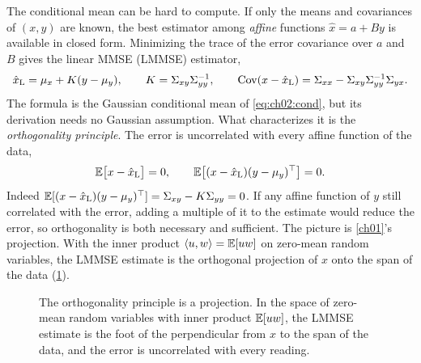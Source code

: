 The conditional mean can be hard to compute. If only the means and
covariances of $(x,y)$ are known, the best estimator among \emph{affine}
functions $\hat x=a+By$ is available in closed form. Minimizing the trace of
the error covariance over $a$ and $B$ gives the linear MMSE (LMMSE) estimator,
\begin{equation}\label{eq:ch02:lmmse}
\hat x_{\mathrm{L}}=\mu_x+K(y-\mu_y),\qquad K=\Sigma_{xy}\Sigma_{yy}^{-1},\qquad
\operatorname{Cov}(x-\hat x_{\mathrm{L}})=\Sigma_{xx}-\Sigma_{xy}\Sigma_{yy}^{-1}\Sigma_{yx}.
\end{equation}
The formula is the Gaussian conditional mean of \cref{eq:ch02:cond}, but its
derivation needs no Gaussian assumption. What characterizes it is the
\emph{orthogonality principle}. The error is uncorrelated with every
affine function of the data,
\begin{equation}\label{eq:ch02:orth}
\mathbb{E}\big[x-\hat x_{\mathrm L}\big]=0,\qquad \mathbb{E}\big[(x-\hat x_{\mathrm L})(y-\mu_y)^{\top}\big]=0 .
\end{equation}
Indeed $\mathbb{E}[(x-\hat x_{\mathrm L})(y-\mu_y)^{\top}]=\Sigma_{xy}-K\Sigma_{yy}=0$. If
any affine function of $y$ still correlated with the error, adding a multiple
of it to the estimate would reduce the error, so orthogonality is both
necessary and sufficient. The picture is \cref{ch01}'s projection. With the
inner product $\langle u,w\rangle=\mathbb{E}[uw]$ on zero-mean random variables, the LMMSE
estimate is the orthogonal projection of $x$ onto the span of the data
(\cref{fig:ch02:orth}).

\begin{figure}[tbp]
\centering
{}
\caption{The orthogonality principle is a projection. In the space of
zero-mean random variables with inner product $\mathbb{E}[uw]$, the LMMSE estimate is
the foot of the perpendicular from $x$ to the span of the data, and the error is
uncorrelated with every reading.}
\label{fig:ch02:orth}
\end{figure}

